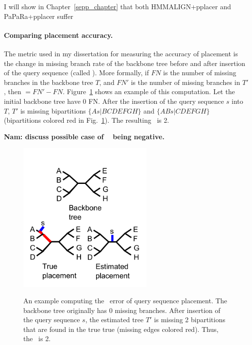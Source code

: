 I will show in Chapter~\ref{sepp_chapter} that both HMMALIGN+pplacer and PaPaRa+pplacer suffer

\paragraph{Comparing placement accuracy.}  
The metric used in my dissertation for measuring the accuracy of placement is the change in missing branch rate of the backbone tree before and after insertion of the query sequence (called \deltafn ).  More formally, if $FN$ is the number of missing branches in the backbone tree $T$, and $FN'$ is the number of missing branches in $T'$, then \deltafn$=FN'-FN$.  Figure~\ref{back:placement_error} shows an example of this computation.  Let the initial backbone tree have 0 FN.  After the insertion of the query sequence $s$ into $T$, $T'$ is missing bipartitions $\{As|BCDEFGH\}$ and $\{ABs|CDEFGH\}$ (bipartitions colored red in Fig.~\ref{back:placement_error}).  The resulting \deltafn~is 2.

\textbf{Nam: discuss possible case of \deltafn~ being negative.}

\begin{figure}[htbp]
\centering
{\includegraphics[width=0.60\textwidth]{background/unrooted_phylogeny_b}}
\caption[Computing \deltafn~error of query sequence placement.]{\label{back:placement_error}An example computing the \deltafn~error of query sequence placement.  The backbone tree originally has 0 missing branches.  After insertion of the query sequence $s$, the estimated tree $T'$ is missing 2 bipartitions that are found in the true true (missing edges colored red).  Thus, the \deltafn~is 2.}
\end{figure}

